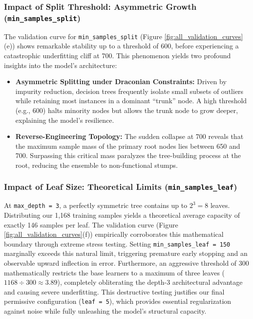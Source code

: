 \documentclass[11pt]{article}
\begin{document}
\subsubsection{Impact of Split Threshold: Asymmetric Growth (\texttt{min\_samples\_split})}

The validation curve for \texttt{min\_samples\_split} (Figure \ref{fig:all_validation_curves}(e)) shows remarkable stability up to a threshold of 600, before experiencing a catastrophic underfitting cliff at 700. This phenomenon yields two profound insights into the model's architecture:

\begin{itemize}[itemsep=0.2cm, topsep=0.2cm, leftmargin=*]
    \item \textbf{Asymmetric Splitting under Draconian Constraints:} Driven by impurity reduction, decision trees frequently isolate small subsets of outliers while retaining most instances in a dominant ``trunk'' node. A high threshold (e.g., 600) halts minority nodes but allows the trunk node to grow deeper, explaining the model's resilience.
    \item \textbf{Reverse-Engineering Topology:} The sudden collapse at 700 reveals that the maximum sample mass of the primary root nodes lies between 650 and 700. Surpassing this critical mass paralyzes the tree-building process at the root, reducing the ensemble to non-functional stumps.
\end{itemize}

\subsubsection{Impact of Leaf Size: Theoretical Limits (\texttt{min\_samples\_leaf})}

At \texttt{max\_depth = 3}, a perfectly symmetric tree contains up to $2^3 = 8$ leaves. Distributing our 1,168 training samples yields a theoretical average capacity of exactly 146 samples per leaf. The validation curve (Figure \ref{fig:all_validation_curves}(f)) empirically corroborates this mathematical boundary through extreme stress testing. Setting \texttt{min\_samples\_leaf = 150} marginally exceeds this natural limit, triggering premature early stopping and an observable upward inflection in error. Furthermore, an aggressive threshold of 300 mathematically restricts the base learners to a maximum of three leaves ($1168 \div 300 \approx 3.89$), completely obliterating the depth-3 architectural advantage and causing severe underfitting. This destructive testing justifies our final permissive configuration (\texttt{leaf = 5}), which provides essential regularization against noise while fully unleashing the model's structural capacity.
\end{document}
